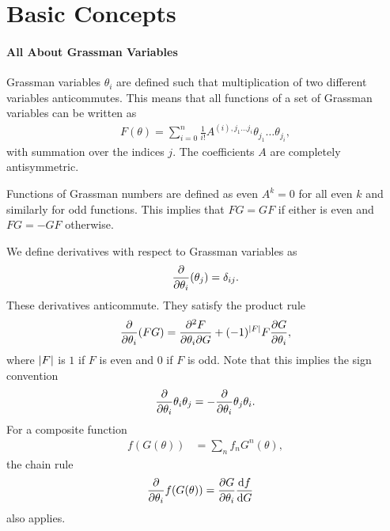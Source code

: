\section{Basic Concepts}

\paragraph{All About Grassman Variables}
Grassman variables $\theta_{i}$ are defined such that multiplication of two different variables anticommutes. This means that all functions of a set of Grassman variables can be written as
\begin{align*}
	F(\theta) = \sum\limits_{i = 0}^{n}\frac{1}{i!}A^{(i), j_{1}\dots j_{i}}\theta_{j_{1}}\dots\theta_{j_{i}},
\end{align*}
with summation over the indices $j$. The coefficients $A$ are completely antisymmetric.

Functions of Grassman numbers are defined as even $A^{k} = 0$ for all even $k$ and similarly for odd functions. This implies that $FG = GF$ if either is even and $FG = -GF$ otherwise.

We define derivatives with respect to Grassman variables as
\begin{align*}
	\pdv{\theta_{i}}(\theta_{j}) = \delta_{ij}.
\end{align*}
These derivatives anticommute. They satisfy the product rule
\begin{align*}
	\pdv{\theta_{i}}(FG) = \pdv{F}{\theta_{i}}{G} + (-1)^{\abs{F}}F\pdv{G}{\theta_{i}},
\end{align*}
where $\abs{F}$ is $1$ if $F$ is even and $0$ if $F$ is odd. Note that this implies the sign convention
\begin{align*}
	\pdv{\theta_{i}}\theta_{i}\theta_{j} = -\pdv{\theta_{i}}\theta_{j}\theta_{i}.
\end{align*}
For a composite function
\begin{align*}
	f(G(\theta)) &= \sum\limits_{n}f_{n}G^{n}(\theta),
\end{align*}
the chain rule
\begin{align*}
	\pdv{\theta_{i}} f(G(\theta)) &= \pdv{G}{\theta_{i}}\dv{f}{G}
\end{align*}
also applies.

